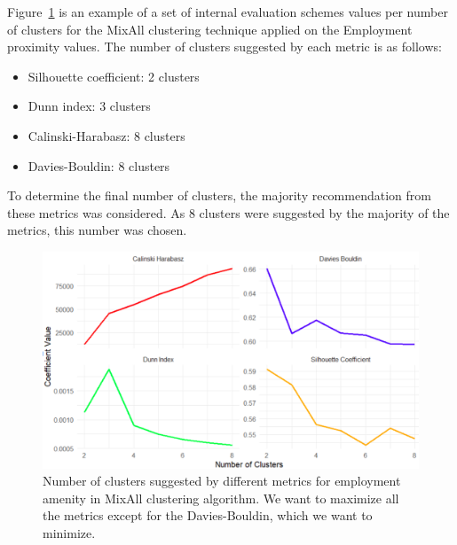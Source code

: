 \documentclass[11pt, a4paper]{article}
\begin{document}
\par
Figure~\ref{numselect} is an example of a set of internal evaluation schemes values per number of clusters for the MixAll clustering technique applied on the Employment proximity values. The number of clusters suggested by each metric is as follows:

\begin{itemize}
\item Silhouette coefficient: 2 clusters
\item Dunn index: 3 clusters
\item Calinski-Harabasz: 8 clusters
\item Davies-Bouldin: 8 clusters
\end{itemize}

To determine the final number of clusters, the majority recommendation from these metrics was considered. As 8 clusters were suggested by the majority of the metrics, this number was chosen.







\begin{figure}[H]
\centering
\includegraphics[width=\textwidth]{./coefs_demo/coefs_demo.png}
\caption[Number of cluster selection]{Number of clusters suggested by different metrics for employment amenity in MixAll clustering algorithm. We want to maximize all the metrics except for the Davies-Bouldin, which we want to minimize.}\label{numselect}
\end{figure}
\end{document}
